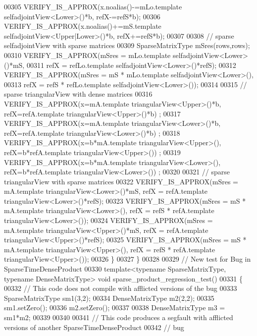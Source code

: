 \begin{DoxyCode}
00305     VERIFY\_IS\_APPROX(x.noalias()-=mLo.template selfadjointView<Lower>()*b, refX-=refS*b);
00306     VERIFY\_IS\_APPROX(x.noalias()+=mS.template selfadjointView<Upper|Lower>()*b, refX+=refS*b);
00307     
00308     \textcolor{comment}{// sparse selfadjointView with sparse matrices}
00309     SparseMatrixType mSres(rows,rows);
00310     VERIFY\_IS\_APPROX(mSres = mLo.template selfadjointView<Lower>()*mS,
00311                      refX = refLo.template selfadjointView<Lower>()*refS);
00312     VERIFY\_IS\_APPROX(mSres = mS * mLo.template selfadjointView<Lower>(),
00313                      refX = refS * refLo.template selfadjointView<Lower>());
00314     
00315     \textcolor{comment}{// sparse triangularView with dense matrices}
00316     VERIFY\_IS\_APPROX(x=mA.template triangularView<Upper>()*b, refX=refA.template triangularView<Upper>()*b)
      ;
00317     VERIFY\_IS\_APPROX(x=mA.template triangularView<Lower>()*b, refX=refA.template triangularView<Lower>()*b)
      ;
00318     VERIFY\_IS\_APPROX(x=b*mA.template triangularView<Upper>(), refX=b*refA.template triangularView<Upper>())
      ;
00319     VERIFY\_IS\_APPROX(x=b*mA.template triangularView<Lower>(), refX=b*refA.template triangularView<Lower>())
      ;
00320     
00321     \textcolor{comment}{// sparse triangularView with sparse matrices}
00322     VERIFY\_IS\_APPROX(mSres = mA.template triangularView<Lower>()*mS,   refX = refA.template 
      triangularView<Lower>()*refS);
00323     VERIFY\_IS\_APPROX(mSres = mS * mA.template triangularView<Lower>(), refX = refS * refA.template 
      triangularView<Lower>());
00324     VERIFY\_IS\_APPROX(mSres = mA.template triangularView<Upper>()*mS,   refX = refA.template 
      triangularView<Upper>()*refS);
00325     VERIFY\_IS\_APPROX(mSres = mS * mA.template triangularView<Upper>(), refX = refS * refA.template 
      triangularView<Upper>());
00326   \}
00327 \}
00328 
00329 \textcolor{comment}{// New test for Bug in SparseTimeDenseProduct}
00330 \textcolor{keyword}{template}<\textcolor{keyword}{typename} SparseMatrixType, \textcolor{keyword}{typename} DenseMatrixType> \textcolor{keywordtype}{void} sparse\_product\_regression\_test()
00331 \{
00332   \textcolor{comment}{// This code does not compile with afflicted versions of the bug}
00333   SparseMatrixType sm1(3,2);
00334   DenseMatrixType m2(2,2);
00335   sm1.setZero();
00336   m2.setZero();
00337 
00338   DenseMatrixType m3 = sm1*m2;
00339 
00340 
00341   \textcolor{comment}{// This code produces a segfault with afflicted versions of another SparseTimeDenseProduct}
00342   \textcolor{comment}{// bug}

\end{DoxyCode}
